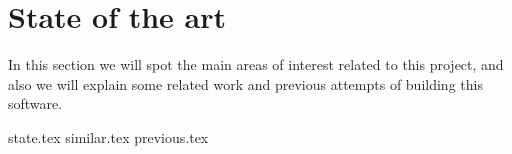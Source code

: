 \section{State of the art}
In this section we will spot the main areas of interest related to this project, and also we will explain some related work and previous attempts of building this software.

{state.tex}
{similar.tex}
{previous.tex}